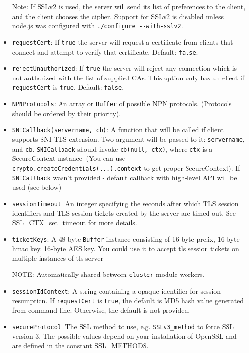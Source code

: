 \begin{itemize}
  Note: If SSLv2 is used, the server will send its list of preferences
  to the client, and the client chooses the cipher. Support for SSLv2 is
  disabled unless node.js was configured with
  \texttt{./configure -{}-with-sslv2}.
\item
  \texttt{requestCert}: If \texttt{true} the server will request a
  certificate from clients that connect and attempt to verify that
  certificate. Default: \texttt{false}.
\item
  \texttt{rejectUnauthorized}: If \texttt{true} the server will reject
  any connection which is not authorized with the list of supplied CAs.
  This option only has an effect if \texttt{requestCert} is
  \texttt{true}. Default: \texttt{false}.
\item
  \texttt{NPNProtocols}: An array or \texttt{Buffer} of possible NPN
  protocols. (Protocols should be ordered by their priority).
\item
  \texttt{SNICallback(servername, cb)}: A function that will be called
  if client supports SNI TLS extension. Two argument will be passed to
  it: \texttt{servername}, and \texttt{cb}. \texttt{SNICallback} should
  invoke \texttt{cb(null, ctx)}, where \texttt{ctx} is a SecureContext
  instance. (You can use \texttt{crypto.createCredentials(...).context}
  to get proper SecureContext). If \texttt{SNICallback} wasn't provided
  - default callback with high-level API will be used (see below).
\item
  \texttt{sessionTimeout}: An integer specifying the seconds after which
  TLS session identifiers and TLS session tickets created by the server
  are timed out. See
  \href{http://www.openssl.org/docs/ssl/SSL_CTX_set_timeout.html}{SSL\_CTX\_set\_timeout}
  for more details.
\item
  \texttt{ticketKeys}: A 48-byte \texttt{Buffer} instance consisting of
  16-byte prefix, 16-byte hmac key, 16-byte AES key. You could use it to
  accept tls session tickets on multiple instances of tls server.

  NOTE: Automatically shared between \texttt{cluster} module workers.
\item
  \texttt{sessionIdContext}: A string containing a opaque identifier for
  session resumption. If \texttt{requestCert} is \texttt{true}, the
  default is MD5 hash value generated from command-line. Otherwise, the
  default is not provided.
\item
  \texttt{secureProtocol}: The SSL method to use, e.g.
  \texttt{SSLv3\_method} to force SSL version 3. The possible values
  depend on your installation of OpenSSL and are defined in the constant
  \href{http://www.openssl.org/docs/ssl/ssl.html\#DEALING_WITH_PROTOCOL_METHODS}{SSL\_METHODS}.
\end{itemize}

